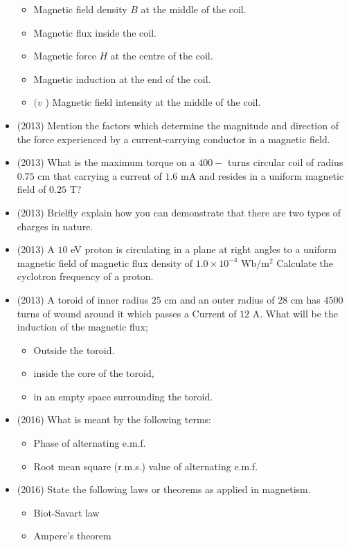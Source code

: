 \documentclass{article}
\begin{document}
\begin{itemize}
\begin{itemize}
\item Magnetic field density $ B$ at the middle of the coil.
\item Magnetic flux inside the coil. 
\item Magnetic force $ H$ at the centre of the coil. 
\item Magnetic induction at the end of the coil.
\item $ (v$ ) Magnetic field intensity at the middle of the coil. 
\end{itemize}
\item (2013)  Mention the factors which determine the magnitude and direction of the force experienced by a current-carrying conductor in a magnetic field.
\item (2013)  What is the maximum torque on a $ 400-$ turns circular coil of radius $ 0.75$ cm that carrying a current of $ 1.6$ mA and resides in a uniform magnetic field of $ 0.25$ T?
\item (2013)  Brielfly explain how you can demonstrate that there are two types of charges in nature.
\item (2013)  A $ 10$ eV proton is circulating in a plane at right angles to a uniform magnetic field of magnetic flux density of $ 1.0 \times 10^{-4}$ Wb$/$m$ ^{2}$ Calculate the cyclotron frequency of a proton.
\item (2013)  A toroid of inner radius $ 25$ cm and an outer radius of $ 28$ cm has $ 4500$ turns of wound around it which passes a Current of $ 12$ A. What will be the induction of the magnetic flux;\begin{itemize}
\item Outside the toroid. 
\item inside the core of the toroid, 
\item in an empty space surrounding the toroid. 
\end{itemize}
\item (2016)  What is meant by the following terms:\begin{itemize}
\item  Phase of alternating e.m.f.
\item  Root mean square (r.m.s.) value of alternating e.m.f.
\end{itemize}
\item (2016)  State the following laws or theorems as applied in magnetism.\begin{itemize}
\item Biot-Savart law
\item Ampere’s theorem
\end{itemize}

\end{itemize}
\end{document}
